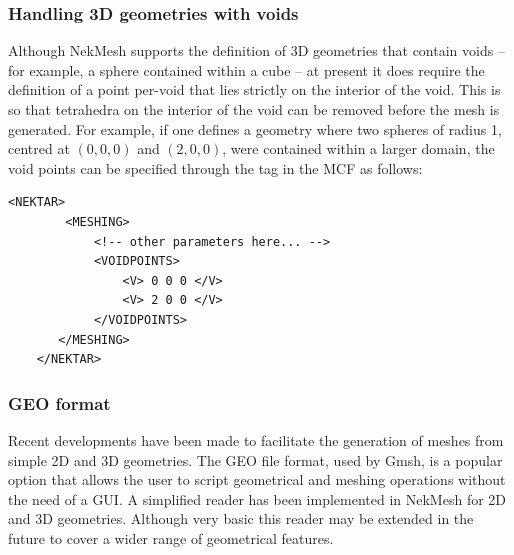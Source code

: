 \subsubsection{Handling 3D geometries with voids}

Although NekMesh supports the definition of 3D geometries that contain voids --
for example, a sphere contained within a cube -- at present it does require the
definition of a point per-void that lies strictly on the interior of the
void. This is so that tetrahedra on the interior of the void can be removed
before the mesh is generated.
%
For example, if one defines a geometry where two spheres of radius 1, centred at
$(0,0,0)$ and $(2,0,0)$, were contained within a larger domain, the void points
can be specified through the  tag in the MCF as follows:

\begin{lstlisting}[style=XmlStyle]
    <NEKTAR>
        <MESHING>
            <!-- other parameters here... -->
            <VOIDPOINTS>
                <V> 0 0 0 </V>
                <V> 2 0 0 </V>
            </VOIDPOINTS>
       </MESHING>
    </NEKTAR>
\end{lstlisting}

\subsubsection{GEO format}

Recent developments have been made to facilitate the generation of meshes from
simple 2D and 3D geometries. The GEO file format, used by Gmsh, is a popular
option that allows the user to script geometrical and meshing operations without
the need of a GUI. A simplified reader has been implemented in NekMesh for 2D
and 3D geometries.  Although very basic this reader may be extended in the
future to cover a wider range of geometrical features.

